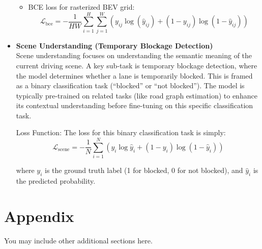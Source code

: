\documentclass{article} %
\begin{document}
\begin{itemize}
\begin{itemize}
			\item BCE loss for rasterized BEV grid:
			\[
			\mathcal{L}_{\text{bce}} = - \frac{1}{HW} \sum_{i=1}^{H}\sum_{j=1}^{W} \left( y_{ij}\log(\hat{y}_{ij}) + (1 - y_{ij})\log(1 - \hat{y}_{ij}) \right)
			\]
		\end{itemize}
		
		
		
		
		\item \textbf{Scene Understanding (Temporary Blockage Detection)}
		\\
		Scene understanding focuses on understanding the semantic meaning of the current driving scene. A key sub-task is temporary blockage detection, where the model determines whether a lane is temporarily blocked. This is framed as a binary classification task (“blocked” or “not blocked”). The model is typically pre-trained on related tasks (like road graph estimation) to enhance its contextual understanding before fine-tuning on this specific classification task.
		
		Loss Function:
		The loss for this binary classification task is simply:
		\[
		\mathcal{L}_{\text{scene}} = - \frac{1}{N} \sum_{i=1}^{N} \left( y_i \log \hat{y}_i + (1 - y_i)\log (1 - \hat{y}_i) \right)
		\]
		
		where \(y_i\) is the ground truth label (1 for blocked, 0 for not blocked), and \(\hat{y}_i\) is the predicted probability.
	\end{itemize}
	
	
	
	
	\appendix
	\section{Appendix}
	You may include other additional sections here.
	
\end{document}
